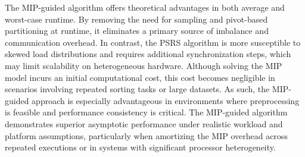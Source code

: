 \documentclass[]{interact}
\theoremstyle{plain}
\theoremstyle{definition}
\theoremstyle{remark}
\begin{document}
The MIP-guided algorithm offers theoretical advantages in both average and worst-case runtime. By removing the need for sampling and pivot-based partitioning at runtime, it eliminates a primary source of imbalance and communication overhead. In contrast, the PSRS algorithm is more susceptible to skewed load distributions and requires additional synchronization steps, which may limit scalability on heterogeneous hardware. Although solving the MIP model incurs an initial computational cost, this cost becomes negligible in scenarios involving repeated sorting tasks or large datasets. As such, the MIP-guided approach is especially advantageous in environments where preprocessing is feasible and performance consistency is critical. The MIP-guided algorithm demonstrates superior asymptotic performance under realistic workload and platform assumptions, particularly when amortizing the MIP overhead across repeated executions or in systems with significant processor heterogeneity.













\end{document}
